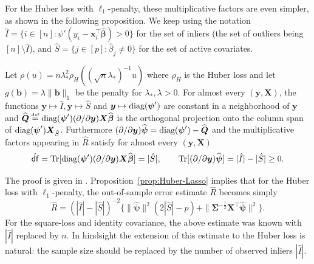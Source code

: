 \documentclass[11pt]{amsart}
\numberwithin{equation}{section}
\numberwithin{equation}{section}
\def\diag{\hbox{\rm diag}}
\DeclareMathOperator{\trace}{Tr}
\def\mathbold{\boldsymbol} %
\def\bb{\mathbold{b}}\def\bhat{\widehat{b}}\def\btil{\widetilde{b}}
\def\bx{\mathbold{x}}\def\xhat{\widehat{x}}\def\xtil{\widetilde{x}}\def\xbar{{\overline x}}\def\vbx{{\bf x}}
\def\bX{\mathbold{X}}\def\hbX{{\widehat{\bX}}}\def\tbX{{\widetilde{\bX}}}\def\bXbar{{\overline \bX}}
\def\by{\mathbold{y}}\def\yhat{\widehat{y}}\def\ytil{\widetilde{y}}\def\ybar{{\overline y}}\def\vby{{\bf y}}
\def\bbeta{\mathbold{\beta}}\def\betahat{\widehat{\beta}}\def\hbeta{\widehat{\beta}}
\def\hbbeta{{{\widehat{\bbeta}}}}
\def\bSigma{\mathbold{\Sigma}}\def\hbSigma{{\widehat{\bSigma}}}
\def\bpsi{\mathbold{\psi}}\def\psihat{\widehat{\psi}}\def\hpsi{\widehat{\psi}}
\def\hbpsi{{\widehat{\bpsi}}}\def\tbpsi{{\widetilde{\bpsi}}}
\def\defas{\stackrel{\text{\tiny def}}{=}}
\def\df{{\hat{\mathsf{df}}}{}}
\newcommand\pb[1]{{ #1 }}
\begin{document}
For the Huber loss with $\ell_1$-penalty,
these multiplicative factors are even simpler, as shown
in the following proposition. We keep using the notation
$\hat I=\{i\in[n]: \psi'(y_i-\bx_i^\top\hbbeta)>0\}$
for the set of inliers (the set of outliers being $[n]\setminus \hat I$),
and $\hat S=\{j\in[p]:\hbeta_j\ne 0\}$ for the set of active covariates.

\begin{proposition}
    \label{prop:Huber-Lasso}
    Let $\rho(u)=n\lambda_*^2\rho_H((\sqrt n\lambda_*)^{-1} u)$ where $\rho_H$ is the Huber loss and let $g(\bb)=\lambda\|\bb\|_1$ be the penalty for $\lambda_*,\lambda>0$.
    For almost every $(\by,\bX)$,
    the functions $\by\mapsto \hat I, \by\mapsto \hat S$ and $\by\mapsto\diag(\bpsi')$ are constant in a neighborhood of $\by$
    and 
    $\hbQ \defas \pb{\diag(\bpsi')} (\partial  /\partial \by) \bX\hbbeta$
is the orthogonal projection onto the column span of $\diag(\bpsi')\bX_{\hat S}$.
Furthermore
$
(\partial / \partial \by )\hbpsi
= \diag(\bpsi') - \hbQ
$ and the multiplicative factors appearing in $\hat R$ satisfy for almost
every $(\by,\bX)$
$$
\df = 
\trace [\diag(\bpsi')(\partial/\partial \by) \bX\hbbeta] = |\hat S|,
\qquad
\trace [ (\partial / \partial \by )\hbpsi ] = |\hat I| - |\hat S|\ge0.
$$
\end{proposition}
The proof is given in .
Proposition~\ref{prop:Huber-Lasso} implies that for the Huber loss with $\ell_1$-penalty,
the out-of-sample error estimate $\hat R$ becomes simply
\begin{equation}
\hat R =(|\hat I| - |\hat S|)^{-2}
\big\{
    \|\hbpsi\|^2(2|\hat S| -p)
    +
    \|\bSigma^{-\frac12}\bX^\top\hbpsi\|^2
\big\}.
\label{eq:hat-R-Huber-Lasso}
\end{equation}
For the square-loss and identity covariance, the above estimate was known
\cite{bayati2013estimating,miolane2018distribution}
with $|\hat I|$ replaced by $n$.
In hindsight the extension of this estimate to the Huber loss
is natural: the sample size should be replaced by
the number of observed inliers $|\hat I|$.
\end{document}

